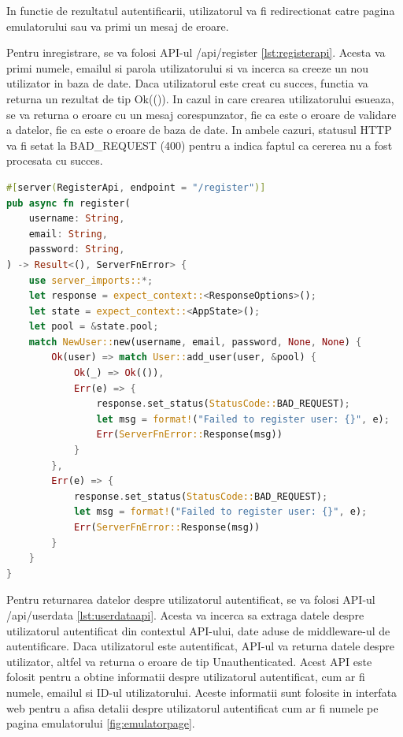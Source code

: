 \documentclass[titlepage,12pt]{article}
\DeclareRobustCommand{\code}[1]{{\ttfamily\small #1}}
\begin{document}
In functie de rezultatul autentificarii, utilizatorul va fi redirectionat catre pagina emulatorului sau va primi un mesaj de eroare.

Pentru inregistrare, se va folosi API-ul \code{/api/register} \cref{lst:registerapi}. Acesta va primi numele, emailul si parola utilizatorului si va incerca sa creeze un nou utilizator in baza de date. Daca utilizatorul este creat cu succes, functia va returna un rezultat de tip \code{Ok(())}. In cazul in care crearea utilizatorului esueaza, se va returna o eroare cu un mesaj corespunzator, fie ca este o eroare de validare a datelor, fie ca este o eroare de baza de date. In ambele cazuri, statusul HTTP va fi setat la \code{BAD\_REQUEST (400)} pentru a indica faptul ca cererea nu a fost procesata cu succes.

\begin{lstlisting}[language=Rust,caption={API pentru inregistrare},label={lst:registerapi}]
#[server(RegisterApi, endpoint = "/register")]
pub async fn register(
    username: String,
    email: String,
    password: String,
) -> Result<(), ServerFnError> {
    use server_imports::*;
    let response = expect_context::<ResponseOptions>();
    let state = expect_context::<AppState>();
    let pool = &state.pool;
    match NewUser::new(username, email, password, None, None) {
        Ok(user) => match User::add_user(user, &pool) {
            Ok(_) => Ok(()),
            Err(e) => {
                response.set_status(StatusCode::BAD_REQUEST);
                let msg = format!("Failed to register user: {}", e);
                Err(ServerFnError::Response(msg))
            }
        },
        Err(e) => {
            response.set_status(StatusCode::BAD_REQUEST);
            let msg = format!("Failed to register user: {}", e);
            Err(ServerFnError::Response(msg))
        }
    }
}
\end{lstlisting}

Pentru returnarea datelor despre utilizatorul autentificat, se va folosi API-ul \code{/api/userdata} \cref{lst:userdataapi}. Acesta va incerca sa extraga datele despre utilizatorul autentificat din contextul API-ului, date aduse de middleware-ul de autentificare. Daca utilizatorul este autentificat, API-ul va returna datele despre utilizator, altfel va returna o eroare de tip \code{Unauthenticated}. Acest API este folosit pentru a obtine informatii despre utilizatorul autentificat, cum ar fi numele, emailul si ID-ul utilizatorului. Aceste informatii sunt folosite in interfata web pentru a afisa detalii despre utilizatorul autentificat cum ar fi numele pe pagina emulatorului \cref{fig:emulatorpage}.
\end{document}
